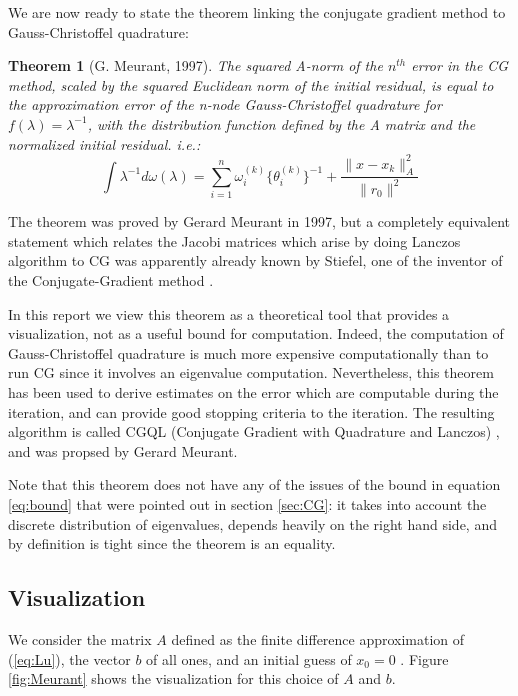 \documentclass[10pt,a4paper]{article}
\newtheorem{theorem}{Theorem}
\begin{document}
We are now ready to state the theorem linking the conjugate gradient method to Gauss-Christoffel quadrature:


\begin{theorem}[G. Meurant, 1997]
The squared A-norm of the $n^{th}$ error in the CG method, scaled by the squared Euclidean norm of the initial residual, is equal to the approximation error of the n-node Gauss-Christoffel quadrature for $f(\lambda) = \lambda^{-1}$, with the distribution function defined by the A matrix and the normalized initial residual.
i.e.:
\begin{equation}
\int \lambda^{-1} d\omega(\lambda) = \sum_{i=1}^{n} \omega_i^{(k)} \{ \theta_i^{(k)} \}^{-1}+ \frac{\| x- x_k \|^2_A}{\| r_0 \|^2}  
\end{equation}
\end{theorem}




The theorem was proved by Gerard Meurant in 1997, but a completely equivalent statement which relates the Jacobi matrices which arise by doing Lanczos algorithm to CG was apparently already known by Stiefel, one of the inventor of the Conjugate-Gradient method \cite{golub2009matrices}. 

In this report we view this theorem as a theoretical tool that provides a visualization, not as a useful bound for computation. Indeed, the computation of Gauss-Christoffel quadrature is much more expensive computationally than to run CG since it involves an eigenvalue computation. Nevertheless, this theorem has been used to derive estimates on the error which are computable during the iteration, and can provide good stopping criteria to the iteration. The resulting algorithm is called CGQL (Conjugate Gradient with Quadrature and Lanczos) \cite{meurant1997computation}, and was propsed by Gerard Meurant.


Note that this theorem does not have any of the issues of the bound in equation \ref{eq:bound} that were pointed out in section \ref{sec:CG}: it takes into account the discrete distribution of eigenvalues, depends heavily on the right hand side, and by definition is tight since the theorem is an equality.
\subsection{Visualization}

We consider the matrix $A$ defined as the finite difference approximation of  (\ref{eq:Lu}), the vector $b$ of all ones, and an initial guess of $x_0 =0 $ . Figure \ref{fig:Meurant} shows the visualization for this choice of $A$ and $b$.
\end{document}
